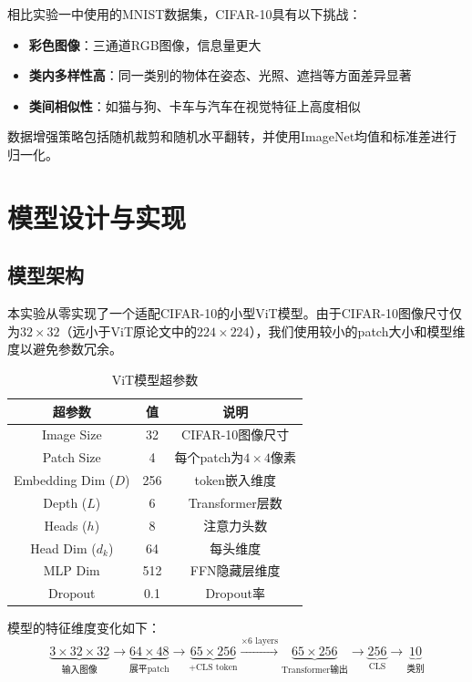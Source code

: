 \documentclass[12pt,a4paper]{article}
\begin{document}
相比实验一中使用的MNIST数据集，CIFAR-10具有以下挑战：
\begin{itemize}
    \item \textbf{彩色图像}：三通道RGB图像，信息量更大
    \item \textbf{类内多样性高}：同一类别的物体在姿态、光照、遮挡等方面差异显著
    \item \textbf{类间相似性}：如猫与狗、卡车与汽车在视觉特征上高度相似
\end{itemize}

数据增强策略包括随机裁剪和随机水平翻转，并使用ImageNet均值和标准差进行归一化。

\section{模型设计与实现}

\subsection{模型架构}

本实验从零实现了一个适配CIFAR-10的小型ViT模型。由于CIFAR-10图像尺寸仅为$32 \times 32$（远小于ViT原论文中的$224 \times 224$），我们使用较小的patch大小和模型维度以避免参数冗余。

\begin{table}[H]
\centering
\begin{tabular}{ccc}
\toprule
超参数 & 值 & 说明 \\
\midrule
Image Size & 32 & CIFAR-10图像尺寸 \\
Patch Size & 4 & 每个patch为$4\times 4$像素 \\
Embedding Dim ($D$) & 256 & token嵌入维度 \\
Depth ($L$) & 6 & Transformer层数 \\
Heads ($h$) & 8 & 注意力头数 \\
Head Dim ($d_k$) & 64 & 每头维度 \\
MLP Dim & 512 & FFN隐藏层维度 \\
Dropout & 0.1 & Dropout率 \\
\bottomrule
\end{tabular}
\caption{ViT模型超参数}
\label{tab:model_config}
\end{table}

模型的特征维度变化如下：
\begin{equation*}
\underbrace{3 \times 32 \times 32}_{\text{输入图像}} \to \underbrace{64 \times 48}_{\text{展平patch}} \to \underbrace{65 \times 256}_{\text{+CLS token}} \xrightarrow{\times 6 \text{ layers}} \underbrace{65 \times 256}_{\text{Transformer输出}} \to \underbrace{256}_{\text{CLS}} \to \underbrace{10}_{\text{类别}}
\end{equation*}
\end{document}
